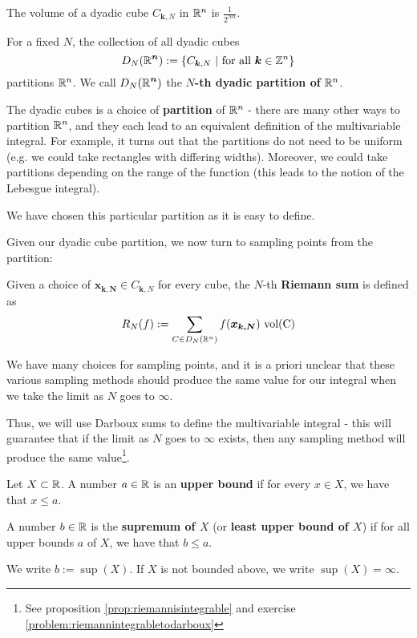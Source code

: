 \begin{proposition}
    The volume of a dyadic cube $C_{\bm{k},N}$ in $\mathbb{R}^n$ is $\frac{1}{2^{Nn}}$.
    \end{proposition}

\begin{proposition}
    For a fixed $N$, the collection of all dyadic cubes $$D_N(\bm{\R^n}) := \left\{C_{\bm{k},N} \ | \ \textnormal{for all} \ \bm{k} \in \Z^n \right\}$$ partitions $\mathbb{R}^n$. We call $D_N(\bm{\mathbb{R}^n})$ the $N$\textbf{-th dyadic partition of} $\mathbb{R}^n$.
    \end{proposition}

The dyadic cubes is a choice of \textbf{partition} of $\mathbb{R}^n$ - there are many other ways to partition $\mathbb{R}^n$, and they each lead to an equivalent definition of the multivariable integral.  For example, it turns out that the partitions do not need to be uniform (e.g. we could take rectangles with differing widths).  Moreover, we could take partitions depending on the range of the function (this leads to the notion of the Lebesgue integral).

We have chosen this particular partition as it is easy to define. 


Given our dyadic cube partition, we now turn to sampling points from the partition:


\begin{definition}\label{def:riemannsum}
    Given a choice of $\bm{x_{k,N}} \in C_{\bm{k},N}$ for every cube, the $N$-th \textbf{Riemann sum} is defined as 
    $$R_N(f) := \sum_{C \in D_N(\mathbb{R}^n)} f(\bm{x_{k,N}}) \ \textnormal{vol(C)}$$
    \end{definition}

We have many choices for sampling points, and it is a priori unclear that these various sampling methods should produce the same value for our integral when we take the limit as $N$ goes to $\infty$.

Thus, we will use Darboux sums to define the multivariable integral - this will guarantee that if the limit as $N$ goes to $\infty$ exists, then any sampling method will produce the same value\footnote{See proposition \ref{prop:riemannisintegrable} and exercise \ref{problem:riemannintegrabletodarboux}}.

 \begin{definition}
    Let $X \subset \mathbb{R}$.  A number $a \in \mathbb{R}$ is an \textbf{upper bound} if for every $x \in X$, we have that $x \leq a$.  
    
    A number $b \in \mathbb{R}$ is the \textbf{supremum of $X$} (or \textbf{least upper bound of $X$}) if for all upper bounds $a$ of $X$, we have that $b \leq a$.
    
    We write $b := \sup(X)$.  If $X$ is not bounded above, we write $\sup(X) = \infty$.
    
    \end{definition}

